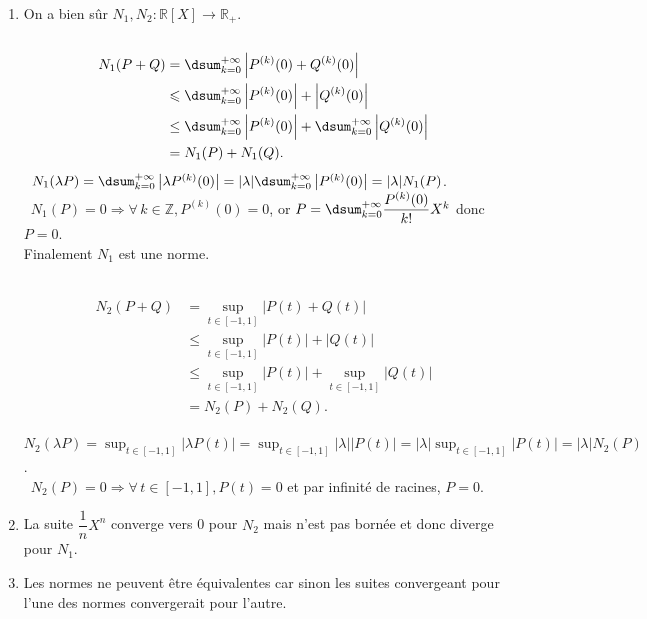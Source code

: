 \begin{enumerate}
\item On a bien sûr $N_1, N_2: \mathbb{R}[X] \rightarrow \mathbb{R}_+$.\\
\bu\
\begin{align*}
N_1(P+Q)&=\dsum_{k=0}^{+\infty}\left|P^{(k)}(0)+Q^{(k)}(0)\right|\\
&\leqslant \dsum_{k=0}^{+\infty}\left|P^{(k)}(0)\right|+\left|Q^{(k)}(0)\right| \\
& \leq \dsum_{k=0}^{+\infty}\left|P^{(k)}(0)\right|+\dsum_{k=0}^{+\infty}\left|Q^{(k)}(0)\right|\\
&=N_1(P)+N_1(Q).
\end{align*}
\bu\ $N_1(\lambda P)=\dsum_{k=0}^{+\infty}\left|\lambda P^{(k)}(0)\right|=|\lambda| \dsum_{k=0}^{+\infty}\left|P^{(k)}(0)\right|=|\lambda| N_1(P)$.\\
\bu\ $N_1(P)=0 \Rightarrow \forall\,k \in \mathbb{Z}, P^{(k)}(0)=0$, or $P=\dsum_{k=0}^{+\infty} \dfrac{P^{(k)}(0)}{k!} X^k$ donc  $P=0$.\\

Finalement $N_1$ est une norme.

\bu\
\begin{align*}
N_2(P+Q)&=\sup _{t \in[-1,1]}|P(t)+Q(t)|\\
&\leqslant \sup _{t \in[-1,1]}|P(t)|+|Q(t)|\\
& \leqslant \sup _{t \in[-1,1]}|P(t)|+\sup _{t \in[-1,1]}|Q(t)|\\
&=N_2(P)+N_2(Q).
\end{align*}
\bu\ $N_2(\lambda P)=\sup _{t \in[-1,1]}|\lambda P(t)|=\sup _{t \in[-1,1]}|\lambda||P(t)|=|\lambda| \sup _{t \in[-1,1]}|P(t)|=|\lambda| N_2(P)$.\\
\bu\ $N_2(P)=0 \Rightarrow \forall\,t \in[-1,1], P(t)=0$ et par infinité de racines, $P=0$.
\item La suite $\dfrac{1}{n} X^n$ converge vers 0 pour $N_2$ mais n'est pas bornée et donc diverge pour $N_1$.
\item Les normes ne peuvent être équivalentes car sinon les suites convergeant pour l'une des normes convergerait pour l'autre.
\end{enumerate}

